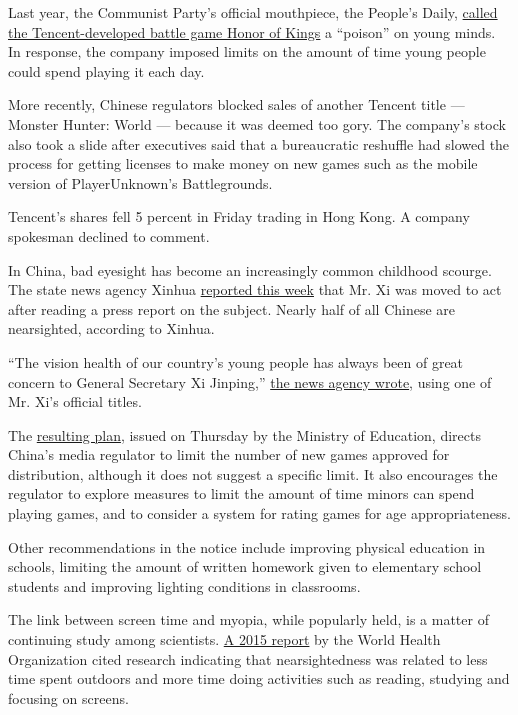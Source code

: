 Last year, the Communist Party's official mouthpiece, the People's
Daily,
\href{https://www.nytimes.com/2017/08/16/business/china-honor-of-kings.html}{called
the Tencent-developed battle game Honor of Kings} a ``poison'' on young
minds. In response, the company imposed limits on the amount of time
young people could spend playing it each day.

More recently, Chinese regulators blocked sales of another Tencent title
--- Monster Hunter: World --- because it was deemed too gory. The
company's stock also took a slide after executives said that a
bureaucratic reshuffle had slowed the process for getting licenses to
make money on new games such as the mobile version of PlayerUnknown's
Battlegrounds.

Tencent's shares fell 5 percent in Friday trading in Hong Kong. A
company spokesman declined to comment.

In China, bad eyesight has become an increasingly common childhood
scourge. The state news agency Xinhua
\href{http://www.xinhuanet.com/politics/2018-08/28/c_1123341203.htm}{reported
this week} that Mr. Xi was moved to act after reading a press report on
the subject. Nearly half of all Chinese are nearsighted, according to
Xinhua.

``The vision health of our country's young people has always been of
great concern to General Secretary Xi Jinping,''
\href{http://www.xinhuanet.com/politics/xxjxs/2018-08/29/c_1123347514.htm}{the
news agency wrote}, using one of Mr. Xi's official titles.

The
\href{http://www.moe.edu.cn/srcsite/A17/moe_943/s3285/201808/t20180830_346672.html}{resulting
plan}, issued on Thursday by the Ministry of Education, directs China's
media regulator to limit the number of new games approved for
distribution, although it does not suggest a specific limit. It also
encourages the regulator to explore measures to limit the amount of time
minors can spend playing games, and to consider a system for rating
games for age appropriateness.

Other recommendations in the notice include improving physical education
in schools, limiting the amount of written homework given to elementary
school students and improving lighting conditions in classrooms.

The link between screen time and myopia, while popularly held, is a
matter of continuing study among scientists.
\href{http://www.who.int/blindness/causes/MyopiaReportforWeb.pdf}{A 2015
report} by the World Health Organization cited research indicating that
nearsightedness was related to less time spent outdoors and more time
doing activities such as reading, studying and focusing on screens.

